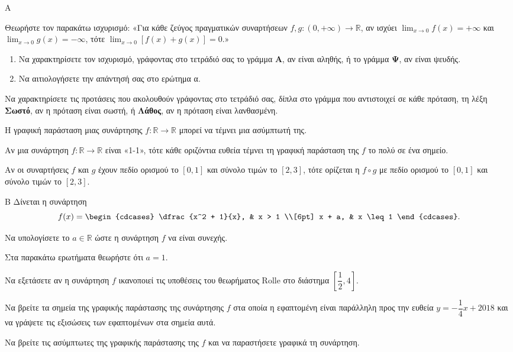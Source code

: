 \begin{thema}{Α}
\begin{erwthma}
    \item Θεωρήστε τον παρακάτω ισχυρισμό: «Για κάθε ζεύγος πραγματικών συναρτήσεων $f, g : (0, +\infty) \to \mathbb{R}$, αν ισχύει $\displaystyle\lim_{x \to 0} f(x) = +\infty$ και $\displaystyle\lim_{x \to 0} g(x) = -\infty$, τότε $\displaystyle\lim_{x \to 0} [f(x) + g(x)] = 0$.»
    \begin{enumerate}[label=\alph*)]
        \item Να χαρακτηρίσετε τον ισχυρισμό, γράφοντας στο τετράδιό σας το γράμμα \textbf{Α}, αν είναι αληθής, ή το γράμμα \textbf{Ψ}, αν είναι ψευδής. 
        \item Να αιτιολογήσετε την απάντησή σας στο ερώτημα α. 
    \end{enumerate}
    \item Να χαρακτηρίσετε τις προτάσεις που ακολουθούν γράφοντας στο τετράδιό σας, δίπλα στο γράμμα που αντιστοιχεί σε κάθε πρόταση, τη λέξη \textbf{Σωστό}, αν η πρόταση είναι σωστή, ή \textbf{Λάθος}, αν η πρόταση είναι λανθασμένη.
    \begin{alist}
        \item Η γραφική παράσταση μιας συνάρτησης $f : \mathbb{R} \to \mathbb{R}$ μπορεί να τέμνει μια ασύμπτωτή της.
        \item Αν μια συνάρτηση $f : \mathbb{R} \to \mathbb{R}$ είναι «1-1», τότε κάθε οριζόντια ευθεία τέμνει τη γραφική παράσταση της $f$ το πολύ σε ένα σημείο.
        \item Αν οι συναρτήσεις $f$ και $g$ έχουν πεδίο ορισμού το $[0, 1]$ και σύνολο τιμών το $[2, 3]$, τότε ορίζεται η $f \circ g$ με πεδίο ορισμού το $[0, 1]$ και σύνολο τιμών το $[2, 3]$.
    \end{alist} 
\end{erwthma}
\end{thema}
\begin{thema}{Β}
Δίνεται η συνάρτηση
\[
f(x) = \begin{cdcases} \dfrac{x^2 + 1}{x}, & x > 1 \\[6pt] x + a, & x \leq 1 \end{cdcases}.
\]
\begin{erwthma}
    \item Να υπολογίσετε το $a \in \mathbb{R}$ ώστε η συνάρτηση $f$ να είναι συνεχής. 
\end{erwthma}

\noindent Στα παρακάτω ερωτήματα θεωρήστε ότι $a = 1$.

\begin{erwthma}[resume]
    \item Να εξετάσετε αν η συνάρτηση $f$ ικανοποιεί τις υποθέσεις του θεωρήματος Rolle στο διάστημα $\left[\dfrac{1}{2}, 4\right]$. 
    \item Να βρείτε τα σημεία της γραφικής παράστασης της συνάρτησης $f$ στα οποία η εφαπτομένη είναι παράλληλη προς την ευθεία $y = -\dfrac{1}{4}x + 2018$ και να γράψετε τις εξισώσεις των εφαπτομένων στα σημεία αυτά. 
    \item Να βρείτε τις ασύμπτωτες της γραφικής παράστασης της $f$ και να παραστήσετε γραφικά τη συνάρτηση. 
\end{erwthma}
\end{thema}
